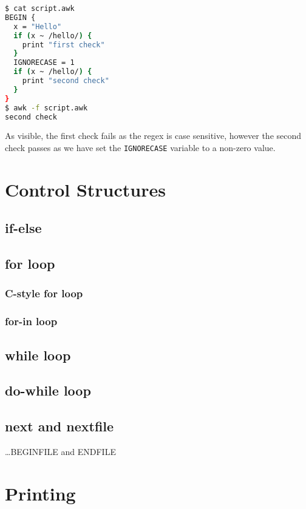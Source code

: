 \begin{lstlisting}[language=bash]
$ cat script.awk
BEGIN {
  x = "Hello"
  if (x ~ /hello/) {
    print "first check"
  }
  IGNORECASE = 1
  if (x ~ /hello/) {
    print "second check"
  }
}
$ awk -f script.awk
second check
\end{lstlisting}

As visible, the first check fails as the regex is case sensitive, however the second check passes as we have set the \lstinline|IGNORECASE| variable to a non-zero value.

\section{Control Structures}

\subsection{if-else}

\subsection{for loop}

\subsubsection{C-style for loop}

\subsubsection{for-in loop}

\subsection{while loop}

\subsection{do-while loop}

\subsection{next and nextfile}


\dots BEGINFILE and ENDFILE

\section{Printing}

